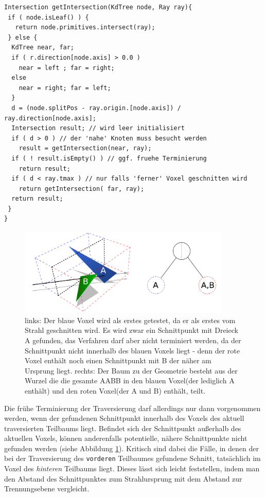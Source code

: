 \begin{lstlisting}[float,caption=Traversierung eines Kd-Trees,label=kdtravcode]
Intersection getIntersection(KdTree node, Ray ray){
 if ( node.isLeaf() ) {
   return node.primitives.intersect(ray);
 } else {
  KdTree near, far;
  if ( r.direction[node.axis] > 0.0 )
    near = left ; far = right;
  else
    near = right; far = left;
  }
  d = (node.splitPos - ray.origin.[node.axis]) / ray.direction[node.axis];
  Intersection result; // wird leer initialisiert
  if ( d > 0 ) // der 'nahe' Knoten muss besucht werden
    result = getIntersection(near, ray);
  if ( ! result.isEmpty() ) // ggf. fruehe Terminierung
    return result;
  if ( d < ray.tmax ) // nur falls 'ferner' Voxel geschnitten wird
    return getIntersection( far, ray);
  return result;
 }
}\end{lstlisting}

\begin{figure}\centering
\includegraphics[width=0.9\textwidth]{images/mailboxing.pdf} 
\caption[Keine Terminierung bei Schnitt außerhalb des aktuellen Voxels]{links: Der blaue Voxel wird als erstes getestet, da er als erstes vom Strahl geschnitten wird. Es wird zwar ein Schnittpunkt mit Dreieck A gefunden, das Verfahren darf aber nicht terminiert werden, da der Schnittpunkt nicht innerhalb des blauen Voxels liegt - denn der rote Voxel enthält noch einen Schnittpunkt mit B der näher am Ursprung liegt. rechts: Der Baum zu der Geometrie besteht aus der Wurzel die die gesamte AABB in den blauen Voxel(der lediglich A enthält) und den roten Voxel(der A und B) enthält, teilt.}
\label{fig:mailbox}
\end{figure}

Die frühe Terminierung der Traversierung darf allerdings nur dann vorgenommen werden, wenn der gefundenen Schnittpunkt innerhalb des Voxels des aktuell traversierten Teilbaums liegt. Befindet sich der Schnittpunkt außerhalb des aktuellen Voxels, können anderenfalls potentielle, nähere Schnittpunkte nicht gefunden werden (siehe Abbildung \ref{fig:mailbox}). Kritisch sind dabei die Fälle, in denen der bei der Traversierung des \texttt{vorderen} Teilbaumes gefundene Schnitt, tatsächlich im Voxel des \textit{hinteren} Teilbaums liegt. Dieses lässt sich leicht feststellen, indem man den Abstand des Schnittpunktes zum Strahlursprung mit dem Abstand zur Trennungsebene vergleicht.

